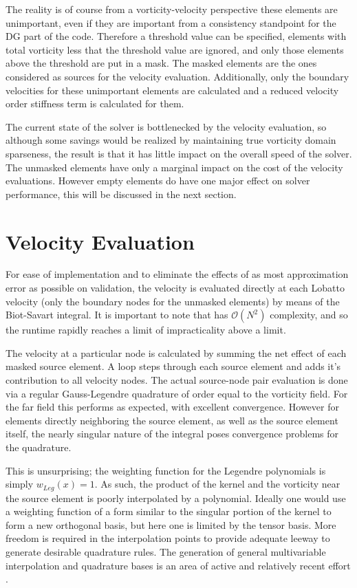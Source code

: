 \documentclass[letterpaper,12pt]{report}
\begin{document}
The reality is of course from a vorticity-velocity perspective these elements are unimportant, even if they are important from a consistency standpoint for the DG part of the code. Therefore a threshold value can be specified, elements with total vorticity less that the threshold value are ignored, and only those elements above the threshold are put in a mask. The masked elements are the ones considered as sources for the velocity evaluation. Additionally, only the boundary velocities for these unimportant elements are calculated and a reduced velocity order stiffness term is calculated for them.

The current state of the solver is bottlenecked by the velocity evaluation, so although some savings would be realized by maintaining true vorticity domain sparseness, the result is that it has little impact on the overall speed of the solver. The unmasked elements have only a marginal impact on the cost of the velocity evaluations. However empty elements do have one major effect on solver performance, this will be discussed in the next section.

%
\section{Velocity Evaluation}
For ease of implementation and to eliminate the effects of as most approximation error as possible on validation, the velocity is evaluated directly at each Lobatto velocity (only the boundary nodes for the unmasked elements) by means of the Biot-Savart integral. It is important to note that has $\mathcal{O}(N^2)$ complexity, and so the runtime rapidly reaches a limit of impracticality above a limit.

The velocity at a particular node is calculated by summing the net effect of each masked source element. A loop steps through each source element and adds it's contribution to all velocity nodes. The actual source-node pair evaluation is done via a regular Gauss-Legendre quadrature of order equal to the vorticity field. For the far field this performs as expected, with excellent convergence. However for elements directly neighboring the source element, as well as the source element itself, the nearly singular nature of the integral poses convergence problems for the quadrature.

This is unsurprising; the weighting function for the Legendre polynomials is simply $w_{Leg}(x)=1$. As such, the product of the kernel and the vorticity near the source element is poorly interpolated by a polynomial. Ideally one would use a weighting function of a form similar to the singular portion of the kernel to form a new orthogonal basis, but here one is limited by the tensor basis. More freedom is required in the interpolation points to provide adequate leeway to generate desirable quadrature rules. The generation of general multivariable interpolation and quadrature bases is an area of active and relatively recent effort \cite{Gasca2000,Xu2012,Gautschi2013}.
\end{document}
